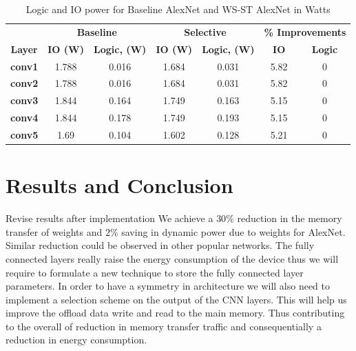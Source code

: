 \documentclass[conference]{IEEEtran}
\begin{document}
\begin{table}[!ht]
\centering
\caption{Logic and IO power for Baseline AlexNet and WS-ST AlexNet in Watts }
\label{LogIO}
\begin{tabular}{ccccccc}
\hline
               & \multicolumn{2}{c}{\textbf{Baseline}} & \multicolumn{2}{c}{\textbf{Selective}} & \multicolumn{2}{c}{\textbf{\% Improvements}} \\ 
\textbf{Layer} & \textbf{IO (W)}               &\textbf{ Logic, (W)}             &\textbf{IO (W)}                  & \textbf{ Logic, (W)}            & \textbf{IO }                                   & \textbf{ Logic}  \\ \hline
\textbf{conv1} & 1.788             & 0.016             & 1.684              & 0.031             & 5.82                 & 0                     \\
\textbf{conv2} & 1.788             & 0.016             & 1.684              & 0.031             & 5.82                 & 0                     \\
\textbf{conv3} & 1.844             & 0.164             & 1.749              & 0.163             & 5.15                 & 0                     \\
\textbf{conv4} & 1.844             & 0.178             & 1.749              & 0.193             & 5.15                 & 0                     \\
\textbf{conv5} & 1.69              & 0.104             & 1.602              & 0.128             & 5.21                 & 0                     \\ \hline
\end{tabular}
\end{table}

\section{Results and Conclusion}
\color{magenta}
Revise results after implementation
\color{black}
We achieve a $30\%$ reduction in the memory transfer of weights and $ 2\%$ saving in dynamic power due to weights for AlexNet. Similar reduction could be observed in other popular networks. The fully connected layers really raise the energy consumption of the device thus we will require to formulate a new technique to store the fully connected layer parameters.
In order to have a symmetry in architecture we will also need to implement a selection scheme on the output of the CNN layers. This will help us improve the offload  data write and read to the main memory. Thus contributing to the overall of reduction in memory transfer traffic and consequentially a reduction in energy consumption. 
\end{document}

